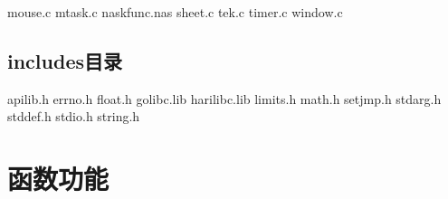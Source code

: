mouse.c                                                                                                                                            
mtask.c                                                                                                                                            
naskfunc.nas                                                                                                                                       
sheet.c                                                                                                                                            
tek.c                                                                                                                                              
timer.c                                                                                                                                            
window.c

\section{includes目录}
apilib.h
errno.h
float.h
golibc.lib
harilibc.lib
limits.h
math.h
setjmp.h
stdarg.h
stddef.h
stdio.h
string.h

\chapter{函数功能} 




